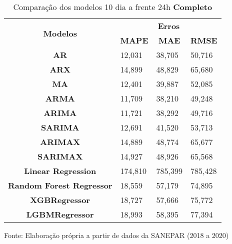 \begin{table}[H]
	\centering
	\caption{Comparação dos modelos 10 dia a frente 24h \textbf{Completo} }\label{tb:10-24cm}
	\begin{tabular}{@{}clll@{}}
		\toprule
		\multirow{2}{*}{\textbf{Modelos}} & \multicolumn{3}{c}{\textbf{Erros}}                                                                       \\ \cmidrule(l){2-4} 
		& \multicolumn{1}{c}{\textbf{MAPE}} & \multicolumn{1}{c}{\textbf{MAE}} & \multicolumn{1}{c}{\textbf{RMSE}} \\ \hline
\textbf{AR}                       & 12,031                            & 38,705                           & 50,716                            \\
\textbf{ARX}                      & 14,899                            & 48,829                           & 65,680                            \\
\textbf{MA}                       & 12,401                            & 39,887                           & 52,085                            \\
\textbf{ARMA}                     & 11,709                            & 38,210                           & 49,248                            \\
\textbf{ARIMA}                    & 11,721                            & 38,292                           & 49,716                            \\
\textbf{SARIMA}                   & 12,691                            & 41,520                           & 53,713                            \\
\textbf{ARIMAX}                   & 14,889                            & 48,774                           & 65,677                            \\
\textbf{SARIMAX}                  & 14,927                            & 48,926                           & 65,568                            \\
\textbf{Linear Regression}        & 174,810                           & 785,399                          & 785,428                           \\
\textbf{Random Forest Regressor}  & 18,559                            & 57,179                           & 74,895                            \\
\textbf{XGBRegressor}             & 18,727                            & 57,666                           & 75,772                            \\
\textbf{LGBMRegressor}            & 18,993                            & 58,395                           & 77,394                            \\ \bottomrule
	\end{tabular}

Fonte: Elaboração própria a partir de dados da SANEPAR (2018 a 2020)
\end{table}


